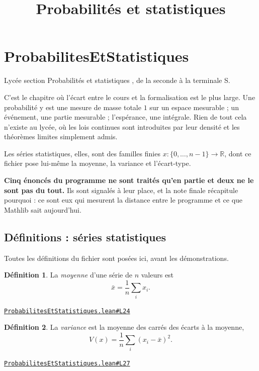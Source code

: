 \documentclass[11pt,a4paper]{article}
\title{Probabilités et statistiques}
\date{}
\theoremstyle{definition}
\newtheorem{definition}{Définition}
\theoremstyle{plain}
\newcommand{\source}[2]{\par\smallskip\noindent\hfill{\footnotesize\href{#1}{\texttt{#2}}}\par\smallskip}
\begin{document}
\maketitle
\sloppy

\section{ProbabilitesEtStatistiques}

\noindent
Lycée \textemdash{} section \og{} Probabilités et statistiques \fg{}, de la seconde à la
terminale S.

\medskip\noindent
C'est le chapitre où l'écart entre le cours et la formalisation est le plus large. Une
probabilité y est une mesure de masse totale $1$ sur un espace mesurable ; un événement,
une partie mesurable ; l'espérance, une intégrale. Rien de tout cela n'existe au lycée, où
les lois continues sont introduites par leur densité et les théorèmes limites simplement
admis.

\medskip\noindent
Les séries statistiques, elles, sont des familles finies $x : \{0, \dots, n-1\} \to
\mathbb{R}$, dont ce fichier pose lui-même la moyenne, la variance et l'écart-type.

\medskip\noindent
\textbf{Cinq énoncés du programme ne sont traités qu'en partie et deux ne le sont pas du
tout.} Ils sont signalés à leur place, et la note finale récapitule pourquoi : ce sont eux
qui mesurent la distance entre le programme et ce que Mathlib sait aujourd'hui.

\subsection{Définitions : séries statistiques}

\noindent
Toutes les définitions du fichier sont posées ici, avant les démonstrations.

\begin{definition}
La \emph{moyenne} d'une série de $n$ valeurs est
\[ \bar x = \frac{1}{n}\sum_{i} x_i . \]
\end{definition}
\source{https://github.com/Commutator-IO/learn-lean/blob/main/cours/02-lycee/09-probabilites-et-statistiques/ProbabilitesEtStatistiques.lean\#L24}{ProbabilitesEtStatistiques.lean\#L24}

\begin{definition}
La \emph{variance} est la moyenne des carrés des écarts à la moyenne,
\[ V(x) = \frac{1}{n}\sum_{i} (x_i - \bar x)^{2} . \]
\end{definition}
\source{https://github.com/Commutator-IO/learn-lean/blob/main/cours/02-lycee/09-probabilites-et-statistiques/ProbabilitesEtStatistiques.lean\#L27}{ProbabilitesEtStatistiques.lean\#L27}
\end{document}
